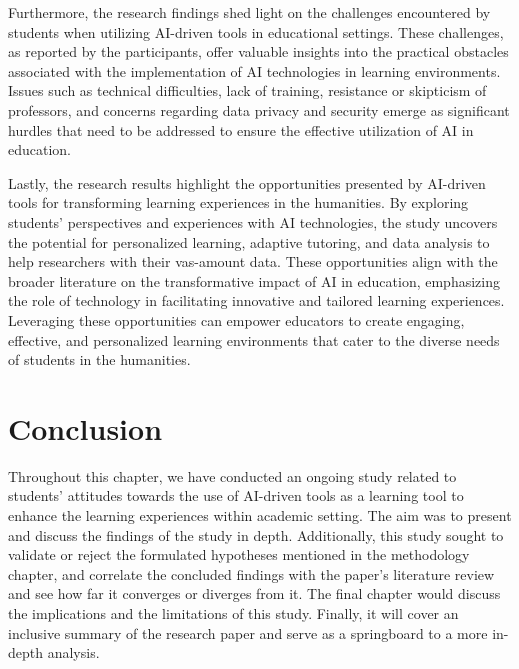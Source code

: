 Furthermore, the research findings shed light on the challenges encountered by 
students when utilizing AI-driven tools in educational settings. These challenges,
as reported by the participants, offer valuable insights into the practical obstacles
associated with the implementation of AI technologies in learning environments.
Issues such as technical difficulties, lack of training, resistance or skipticism of professors, 
and concerns regarding data privacy and security emerge as significant 
hurdles that need to be addressed to ensure the effective utilization of AI in education.


Lastly, the research results highlight the opportunities presented by AI-driven 
tools for transforming learning experiences in the humanities. By exploring 
students' perspectives and experiences with AI technologies, the study uncovers 
the potential for personalized learning, adaptive tutoring, and data analysis to help researchers
with their vas-amount data. These opportunities align with the broader literature 
on the transformative impact of AI in education, emphasizing the role of technology 
in facilitating innovative and tailored learning experiences. Leveraging these 
opportunities can empower educators to create engaging, effective, and personalized 
learning environments that cater to the diverse needs of students in the humanities.


\section{Conclusion}
Throughout this chapter, we have conducted an ongoing study related to students’
attitudes towards the use of AI-driven tools as a learning tool to enhance the learning experiences
within academic setting. The aim was to present and discuss the findings of the study in depth.
Additionally, this study sought to validate or reject the formulated hypotheses mentioned
in the methodology chapter, and correlate the concluded findings with the paper’s literature
review and see how far it converges or diverges from it. The final chapter would discuss
the implications and the limitations of this study. Finally, it will cover an inclusive summary
of the research paper and serve as a springboard to a more in-depth analysis.
